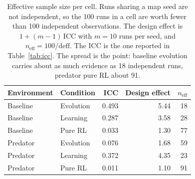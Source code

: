 \begin{table}[t]
  \centering
  \caption{Effective sample size per cell. Runs sharing a map seed are not
  independent, so the 100 runs in a cell are worth fewer than 100 independent
  observations. The design effect is $1 + (m-1)\,\mathrm{ICC}$ with $m = 10$
  runs per seed, and $n_{\mathrm{eff}} = 100 / \mathrm{deff}$. The ICC is the
  one reported in Table~\ref{tab:icc}. The spread is the point: baseline
  evolution carries about as much evidence as 18 independent runs, predator
  pure RL about 91.}
  \label{tab:neff}
  \small
  \setlength{\tabcolsep}{6pt}
  \begin{tabular}{@{}llrrr@{}}
    \toprule
    Environment & Condition & ICC & Design effect & $n_{\mathrm{eff}}$ \\
    \midrule
    Baseline & Evolution & 0.493 & 5.44 & 18 \\
    Baseline & Learning & 0.287 & 3.58 & 28 \\
    Baseline & Pure RL & 0.033 & 1.30 & 77 \\
    Predator & Evolution & 0.076 & 1.68 & 59 \\
    Predator & Learning & 0.372 & 4.35 & 23 \\
    Predator & Pure RL & 0.011 & 1.10 & 91 \\
    \bottomrule
  \end{tabular}
\end{table}
